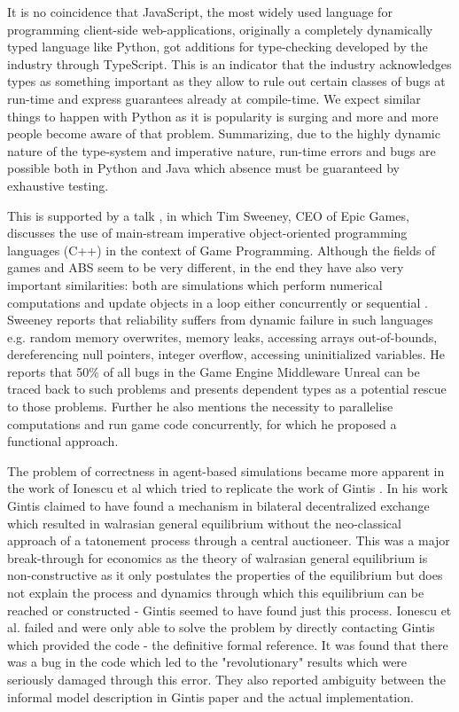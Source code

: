 It is no coincidence that JavaScript, the most widely used language for programming client-side web-applications, originally a completely dynamically typed language like Python, got additions for type-checking developed by the industry through TypeScript. This is an indicator that the industry acknowledges types as something important as they allow to rule out certain classes of bugs at run-time and express guarantees already at compile-time. We expect similar things to happen with Python as it is popularity is surging and more and more people become aware of that problem. Summarizing, due to the highly dynamic nature of the type-system and imperative nature, run-time errors and bugs are possible both in Python and Java which absence must be guaranteed by exhaustive testing. 

This is supported by a talk \cite{sweeney_next_2006}, in which Tim Sweeney, CEO of Epic Games, discusses the use of main-stream imperative object-oriented programming languages (C++) in the context of Game Programming. Although the fields of games and ABS seem to be very different, in the end they have also very important similarities: both are simulations which perform numerical computations and update objects in a loop either concurrently or sequential \cite{gregory_game_2018}. Sweeney reports that reliability suffers from dynamic failure in such languages e.g. random memory overwrites, memory leaks, accessing arrays out-of-bounds, dereferencing null pointers, integer overflow, accessing uninitialized variables. He reports that 50\% of all bugs in the Game Engine Middleware Unreal can be traced back to such problems and presents dependent types as a potential rescue to those problems. Further he also mentions the necessity to parallelise computations and run game code concurrently, for which he proposed a functional approach.

The problem of correctness in agent-based simulations became more apparent in the work of Ionescu et al \cite{ionescu_dependently-typed_2012} which tried to replicate the work of Gintis \cite{gintis_emergence_2006}. In his work Gintis claimed to have found a mechanism in bilateral decentralized exchange which resulted in walrasian general equilibrium without the neo-classical approach of a tatonement process through a central auctioneer. This was a major break-through for economics as the theory of walrasian general equilibrium is non-constructive as it only postulates the properties of the equilibrium \cite{colell_microeconomic_1995} but does not explain the process and dynamics through which this equilibrium can be reached or constructed - Gintis seemed to have found just this process. Ionescu et al. \cite{ionescu_dependently-typed_2012} failed and were only able to solve the problem by directly contacting Gintis which provided the code - the definitive formal reference. It was found that there was a bug in the code which led to the "revolutionary" results which were seriously damaged through this error. They also reported ambiguity between the informal model description in Gintis paper and the actual implementation.

